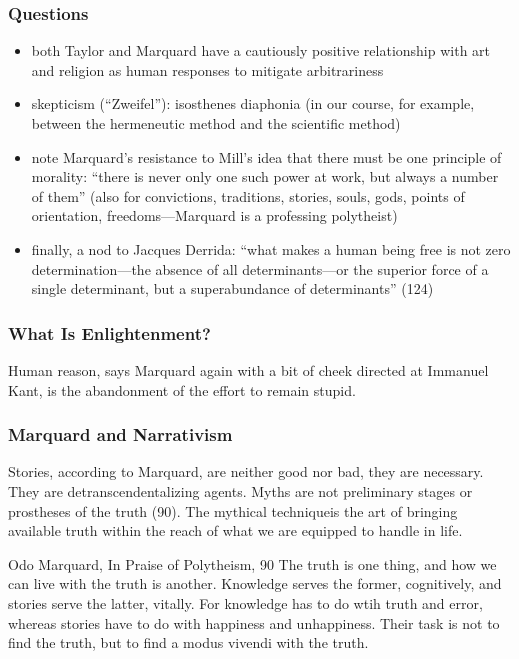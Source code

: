 \documentclass[xcolor=dvipsnames]{beamer}
\begin{document}
\begin{frame}
  \frametitle{Questions}
  \begin{itemize}
  \item both Taylor and Marquard have a cautiously positive
    relationship with art and religion as human responses to mitigate
    arbitrariness
  \item skepticism (``Zweifel''): isosthenes diaphonia (in our course,
    for example, between the hermeneutic method and the scientific
    method)
  \item note Marquard's resistance to Mill's idea that there must be
    one principle of morality: ``there is never only one such power at
    work, but always a number of them'' (also for convictions,
    traditions, stories, souls, gods, points of orientation,
    freedoms---Marquard is a professing polytheist)
  \item finally, a nod to Jacques Derrida: ``what makes a human being
    free is not zero determination---the absence of all
    determinants---or the superior force of a single determinant, but
    a superabundance of determinants'' (124)
  \end{itemize}
\end{frame}

\begin{frame}
  \frametitle{What Is Enlightenment?}
  Human reason, says Marquard again with a bit of cheek directed at
  Immanuel Kant, is \alert{the abandonment of the effort to remain
    stupid}.
\end{frame}

\begin{frame}
  \frametitle{Marquard and Narrativism}
  Stories, according to Marquard, are neither good nor bad, they are
  necessary. They are detranscendentalizing agents. Myths are not
  preliminary stages or prostheses of the truth (90). The mythical
  techniqueis the art of bringing available truth within the reach of
  what we are equipped to handle in life.
  \begin{block}{Odo Marquard, In Praise of Polytheism, 90}
    The truth is one thing, and how we can live with the truth is
    another. Knowledge serves the former, cognitively, and stories
    serve the latter, vitally. For knowledge has to do wtih truth and
    error, whereas stories have to do with happiness and unhappiness.
    Their task is not to find the truth, but to find a modus vivendi
    with the truth.
  \end{block}
\end{frame}
\end{document}
